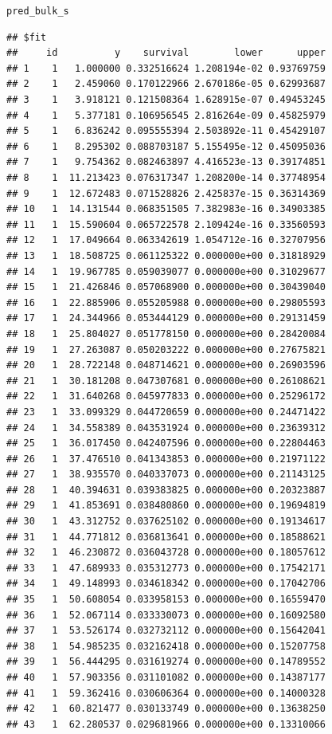 \documentclass[article]{jss}\usepackage[]{graphicx}\usepackage[]{xcolor}
\makeatletter
\newcommand{\hldef}[1]{\textcolor[rgb]{0.345,0.345,0.345}{#1}}%
\newenvironment{kframe}{%
 \def\at@end@of@kframe{}%
 \ifinner\ifhmode%
  \def\at@end@of@kframe{\end{minipage}}%
  \begin{minipage}{\columnwidth}%
 \fi\fi%
 \def\FrameCommand##1{\hskip\@totalleftmargin \hskip-\fboxsep
 \colorbox{shadecolor}{##1}\hskip-\fboxsep
     \hskip-\linewidth \hskip-\@totalleftmargin \hskip\columnwidth}%
 \MakeFramed {\advance\hsize-\width
   \@totalleftmargin\z@ \linewidth\hsize
   \@setminipage}}%
 {\par\unskip\endMakeFramed%
 \at@end@of@kframe}
\newenvironment{knitrout}{}{} %
\makeatother
\begin{document}
\begin{knitrout}
\begin{kframe}
\begin{alltt}
\hldef{pred_bulk_s}
\end{alltt}
\begin{verbatim}
## $fit
##     id          y    survival        lower      upper
## 1    1   1.000000 0.332516624 1.208194e-02 0.93769759
## 2    1   2.459060 0.170122966 2.670186e-05 0.62993687
## 3    1   3.918121 0.121508364 1.628915e-07 0.49453245
## 4    1   5.377181 0.106956545 2.816264e-09 0.45825979
## 5    1   6.836242 0.095555394 2.503892e-11 0.45429107
## 6    1   8.295302 0.088703187 5.155495e-12 0.45095036
## 7    1   9.754362 0.082463897 4.416523e-13 0.39174851
## 8    1  11.213423 0.076317347 1.208200e-14 0.37748954
## 9    1  12.672483 0.071528826 2.425837e-15 0.36314369
## 10   1  14.131544 0.068351505 7.382983e-16 0.34903385
## 11   1  15.590604 0.065722578 2.109424e-16 0.33560593
## 12   1  17.049664 0.063342619 1.054712e-16 0.32707956
## 13   1  18.508725 0.061125322 0.000000e+00 0.31818929
## 14   1  19.967785 0.059039077 0.000000e+00 0.31029677
## 15   1  21.426846 0.057068900 0.000000e+00 0.30439040
## 16   1  22.885906 0.055205988 0.000000e+00 0.29805593
## 17   1  24.344966 0.053444129 0.000000e+00 0.29131459
## 18   1  25.804027 0.051778150 0.000000e+00 0.28420084
## 19   1  27.263087 0.050203222 0.000000e+00 0.27675821
## 20   1  28.722148 0.048714621 0.000000e+00 0.26903596
## 21   1  30.181208 0.047307681 0.000000e+00 0.26108621
## 22   1  31.640268 0.045977833 0.000000e+00 0.25296172
## 23   1  33.099329 0.044720659 0.000000e+00 0.24471422
## 24   1  34.558389 0.043531924 0.000000e+00 0.23639312
## 25   1  36.017450 0.042407596 0.000000e+00 0.22804463
## 26   1  37.476510 0.041343853 0.000000e+00 0.21971122
## 27   1  38.935570 0.040337073 0.000000e+00 0.21143125
## 28   1  40.394631 0.039383825 0.000000e+00 0.20323887
## 29   1  41.853691 0.038480860 0.000000e+00 0.19694819
## 30   1  43.312752 0.037625102 0.000000e+00 0.19134617
## 31   1  44.771812 0.036813641 0.000000e+00 0.18588621
## 32   1  46.230872 0.036043728 0.000000e+00 0.18057612
## 33   1  47.689933 0.035312773 0.000000e+00 0.17542171
## 34   1  49.148993 0.034618342 0.000000e+00 0.17042706
## 35   1  50.608054 0.033958153 0.000000e+00 0.16559470
## 36   1  52.067114 0.033330073 0.000000e+00 0.16092580
## 37   1  53.526174 0.032732112 0.000000e+00 0.15642041
## 38   1  54.985235 0.032162418 0.000000e+00 0.15207758
## 39   1  56.444295 0.031619274 0.000000e+00 0.14789552
## 40   1  57.903356 0.031101082 0.000000e+00 0.14387177
## 41   1  59.362416 0.030606364 0.000000e+00 0.14000328
## 42   1  60.821477 0.030133749 0.000000e+00 0.13638250
## 43   1  62.280537 0.029681966 0.000000e+00 0.13310066

\end{verbatim}
\end{kframe}
\end{knitrout}
\end{document}
